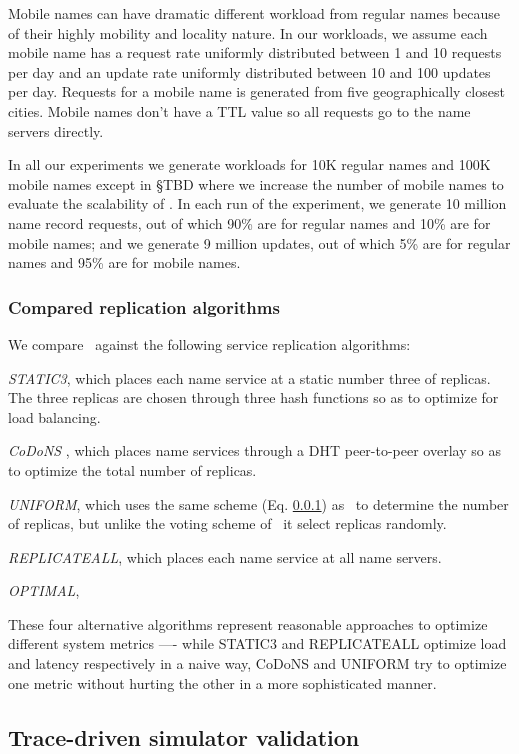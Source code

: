Mobile names can have dramatic different workload from regular names because of their highly mobility and locality nature. In our workloads, we assume each mobile name has a request rate uniformly distributed between 1 and 10 requests per day and an update rate uniformly distributed between 10 and 100 updates per day. Requests for a mobile name is generated from five geographically closest cities. Mobile names don't have a TTL value so all requests go to the name servers directly.

In all our experiments we generate workloads for 10K regular names and 100K mobile names except in \S TBD where we increase the number of mobile names to evaluate the scalability of \auspice. In each run of the experiment, we generate 10 million name record requests, out of which 90\% are for regular names and 10\% are for mobile names; and we generate 9 million updates,  out of which 5\% are for regular names and 95\% are for mobile names.

\subsubsection{Compared replication algorithms}

We compare \auspice\ against the following service replication algorithms:

{\it STATIC3}, which places each name service at a static number three of replicas. The three replicas are chosen through three hash functions so as to optimize for load balancing. 

{\it CoDoNS} \cite{codons}, which places name services through a DHT peer-to-peer overlay so as to optimize the total number of replicas.

{\it UNIFORM},  which uses the same scheme (Eq. \ref{}) as \auspice\ to determine the number of replicas, but unlike the voting scheme of \auspice\ it select replicas randomly.

{\it REPLICATEALL}, which places each name service at all name servers.

{\it OPTIMAL}, 

These four alternative algorithms represent reasonable approaches to optimize different system metrics ---- while STATIC3 and REPLICATEALL optimize load and latency respectively in a naive way, CoDoNS and UNIFORM try to optimize one metric without hurting the other in a more sophisticated manner.

\subsection{Trace-driven simulator validation}
\label{subsec:simulatorval}

